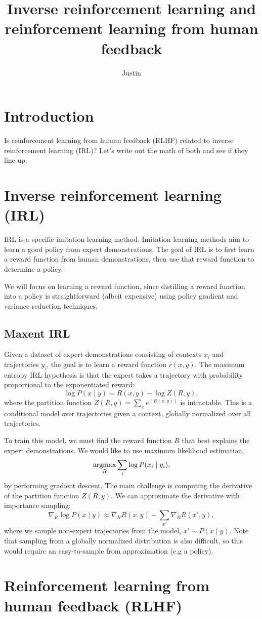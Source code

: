 \documentclass{article}
\begin{document}
\title{Inverse reinforcement learning and reinforcement learning from human feedback}
\author{Justin}
\maketitle

\section{Introduction}
Is reinforcement learning from human feedback (RLHF)
related to inverse reinforcement learning (IRL)?
Let's write out the math of both and see if they line up.

\section{Inverse reinforcement learning (IRL)}
IRL is a specific imitation learning method.
Imitation learning methods aim to learn a good policy from expert demonstrations.
The goal of IRL is to first learn a reward function from human demonstrations,
then use that reward function to determine a policy.

We will focus on learning a reward function, since distilling a reward function into a policy
is straightforward (albeit expensive) using policy gradient and variance reduction techniques.

\subsection{Maxent IRL}
Given a dataset of expert demonstrations consisting of contexts
$x_i$ and trajectories $y_i$,
the goal is to learn a reward function $r(x, y)$.
The maximum entropy IRL hypothesis is that the expert takes a trajectory
with probability proportional to the exponentiated reward:
\begin{equation}
\log P(x \mid y) = R(x, y) - \log Z(R,y),
\end{equation}
where the partition function $Z(R,y) = \sum_x e^{(R(x,y))}$ is intractable.
This is a conditional model over trajectories given a context,
globally normalized over all trajectories.

To train this model, we must find the reward function $R$ that best explains the
expert demonstrations.
We would like to use maximum likelihood estimation,
$$\operatorname*{argmax}_R \sum_i \log P(x_i \mid y_i),$$
by performing gradient descent.
The main challenge is computing the derivative of the partition function $Z(R,y)$.
We can approximate the derivative with importance sampling:
$$\nabla_R \log P(x \mid y) \approx \nabla_R R(x,y) - \sum_{x'}\nabla_R R(x',y),$$
where we sample non-expert trajectories from the model, $x'\sim P(x \mid y)$.
Note that sampling from a globally normalized distribution is also difficult,
so this would require an easy-to-sample from approximation (e.g a policy).

\section{Reinforcement learning from human feedback (RLHF)}
\end{document}
